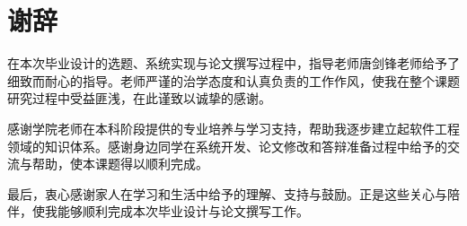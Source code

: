 \chapter*{谢辞}

在本次毕业设计的选题、系统实现与论文撰写过程中，指导老师唐剑锋老师给予了细致而耐心的指导。老师严谨的治学态度和认真负责的工作作风，使我在整个课题研究过程中受益匪浅，在此谨致以诚挚的感谢。

感谢学院老师在本科阶段提供的专业培养与学习支持，帮助我逐步建立起软件工程领域的知识体系。感谢身边同学在系统开发、论文修改和答辩准备过程中给予的交流与帮助，使本课题得以顺利完成。

最后，衷心感谢家人在学习和生活中给予的理解、支持与鼓励。正是这些关心与陪伴，使我能够顺利完成本次毕业设计与论文撰写工作。

